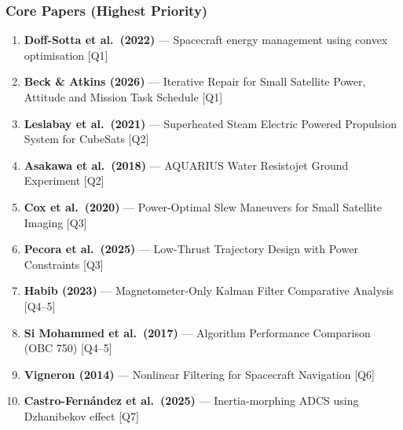 \documentclass[11pt]{article}
\begin{document}
\subsubsection{Core Papers (Highest Priority)}
\begin{enumerate}
    \item \textbf{Doff-Sotta et al.\ (2022)} --- Spacecraft energy management using convex optimisation [Q1]
    \item \textbf{Beck \& Atkins (2026)} --- Iterative Repair for Small Satellite Power, Attitude and Mission Task Schedule [Q1]
    \item \textbf{Leslabay et al.\ (2021)} --- Superheated Steam Electric Powered Propulsion System for CubeSats [Q2]
    \item \textbf{Asakawa et al.\ (2018)} --- AQUARIUS Water Resistojet Ground Experiment [Q2]
    \item \textbf{Cox et al.\ (2020)} --- Power-Optimal Slew Maneuvers for Small Satellite Imaging [Q3]
    \item \textbf{Pecora et al.\ (2025)} --- Low-Thrust Trajectory Design with Power Constraints [Q3]
    \item \textbf{Habib (2023)} --- Magnetometer-Only Kalman Filter Comparative Analysis [Q4--5]
    \item \textbf{Si Mohammed et al.\ (2017)} --- Algorithm Performance Comparison (OBC 750) [Q4--5]
    \item \textbf{Vigneron (2014)} --- Nonlinear Filtering for Spacecraft Navigation [Q6]
    \item \textbf{Castro-Fern\'{a}ndez et al.\ (2025)} --- Inertia-morphing ADCS using Dzhanibekov effect [Q7]
\end{enumerate}
\end{document}
